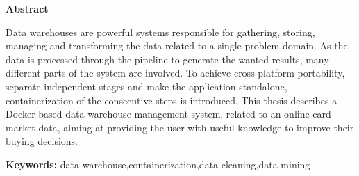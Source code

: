 
\newpage
\thispagestyle{empty}
\mbox{}
\clearpage

\thispagestyle{plain}
\vspace*{4.8cm}
\begin{center}
    \textbf{Abstract}
\end{center}
Data warehouses are powerful systems responsible for gathering, storing, managing and transforming the data related to a single problem domain. As the data is processed through the pipeline to generate the wanted results, many different parts of the system are involved. To achieve cross-platform portability, separate independent stages and make the application standalone, containerization of the consecutive steps is introduced. This thesis describes a Docker-based data warehouse management system, related to an online card market data, aiming at providing the user with useful knowledge to improve their buying decisions. \par \noindent
\textbf{Keywords: }\;data warehouse,\;containerization,\;data cleaning,\;data mining

\setcounter{page}{0}
\tableofcontents

\pagestyle{fancy}
